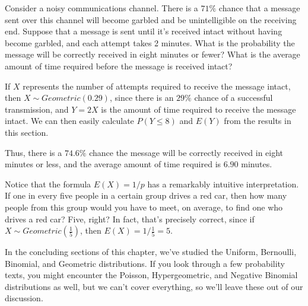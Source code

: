 \begin{examp} 
Consider a noisy communications channel. There is a $71\%$ chance that a message sent over this channel will become garbled and be unintelligible on the receiving end. Suppose that a message is sent until it's received intact without having become garbled, and each attempt takes 2 minutes. What is the probability the message will be correctly received in eight minutes or fewer? What is the average amount of time required before the message is received intact?
\par
\noindent If $X$ represents the number of attempts required to receive the message intact, then $X \sim Geometric(0.29)$, since there is an $29\%$ chance of a successful transmission, and $Y = 2X$ is the amount of time required to receive the message intact. We can then easily calculate $P(Y \leq 8)$ and $E(Y)$ from the results in this section.
\par
\noindent Thus, there is a $74.6\%$ chance the message will be correctly received in eight minutes or less, and the average amount of time required is $6.90$ minutes.
\end{examp}

\par
Notice that the formula $E(X) = 1/p$ has a remarkably intuitive interpretation. If one in every five people in a certain group drives a red car, then how many people from this group would you have to meet, on average, to find one who drives a red car? Five, right? In fact, that's precisely correct, since if $X \sim Geometric(\frac{1}{5})$, then $E(X) = 1/\frac{1}{5}=5$.
\par
In the concluding sections of this chapter, we've studied the Uniform, Bernoulli, Binomial, and Geometric distributions. If you look through a few probability texts, you might encounter the Poisson, Hypergeometric, and Negative Binomial distributions as well, but we can't cover everything, so we'll leave these out of our discussion.




